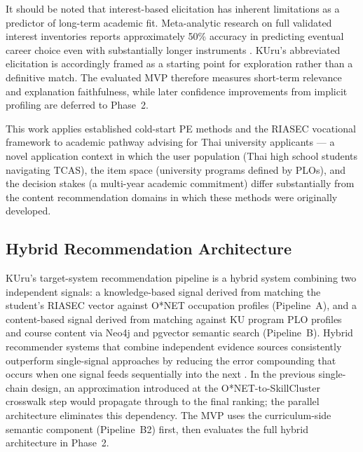 It should be noted that interest-based elicitation has inherent limitations as a predictor of long-term academic fit. Meta-analytic research on full validated interest inventories reports approximately 50\% accuracy in predicting eventual career choice even with substantially longer instruments \cite{holland1997}. KUru's abbreviated elicitation is accordingly framed as a starting point for exploration rather than a definitive match. The evaluated MVP therefore measures short-term relevance and explanation faithfulness, while later confidence improvements from implicit profiling are deferred to Phase~2.

This work applies established cold-start PE methods and the RIASEC vocational framework to academic pathway advising for Thai university applicants --- a novel application context in which the user population (Thai high school students navigating TCAS), the item space (university programs defined by PLOs), and the decision stakes (a multi-year academic commitment) differ substantially from the content recommendation domains in which these methods were originally developed.

\subsection{Hybrid Recommendation Architecture}
\label{subsection:hybrid-recommendation}

KUru's target-system recommendation pipeline is a hybrid system combining two independent signals: a knowledge-based signal derived from matching the student's RIASEC vector against O*NET occupation profiles (Pipeline~A), and a content-based signal derived from matching against KU program PLO profiles and course content via Neo4j and pgvector semantic search (Pipeline~B). Hybrid recommender systems that combine independent evidence sources consistently outperform single-signal approaches by reducing the error compounding that occurs when one signal feeds sequentially into the next \cite{bobadilla2014coldstart}. In the previous single-chain design, an approximation introduced at the O*NET-to-SkillCluster crosswalk step would propagate through to the final ranking; the parallel architecture eliminates this dependency. The MVP uses the curriculum-side semantic component (Pipeline~B2) first, then evaluates the full hybrid architecture in Phase~2.
